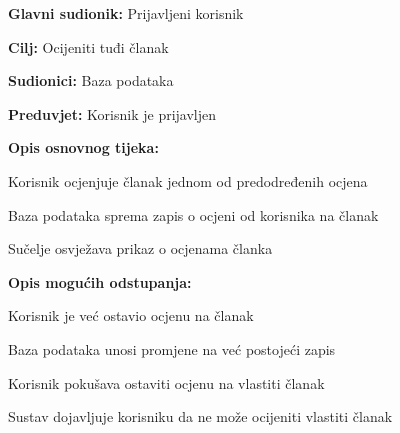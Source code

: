 \noindent {}
\begin{packed_item}

\item \textbf{Glavni sudionik:} Prijavljeni korisnik
\item  \textbf{Cilj:} Ocijeniti tuđi članak
\item  \textbf{Sudionici:} Baza podataka
\item  \textbf{Preduvjet:} Korisnik je prijavljen
\item  \textbf{Opis osnovnog tijeka:}

\item[] \begin{packed_enum}

    \item Korisnik ocjenjuje članak jednom od predodređenih ocjena
    \item Baza podataka sprema zapis o ocjeni od korisnika na članak
    \item Sučelje osvježava prikaz o ocjenama članka

\end{packed_enum}

\item  \textbf{Opis mogućih odstupanja:}

\item[] \begin{packed_item}

    \item[2.a] Korisnik je već ostavio ocjenu na članak
    \item[] \begin{packed_enum}

        \item Baza podataka unosi promjene na već postojeći zapis

    \end{packed_enum}

    \item[2.b] Korisnik pokušava ostaviti ocjenu na vlastiti članak
    \item[] \begin{packed_enum}

        \item Sustav dojavljuje korisniku da ne može ocijeniti vlastiti članak

    \end{packed_enum}

\end{packed_item}
\end{packed_item}

